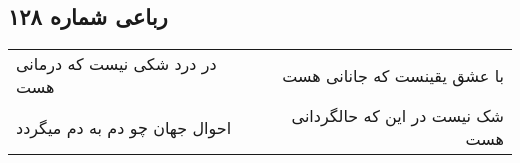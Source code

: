 \begin{center}
\section*{رباعی شماره ۱۲۸}
\label{sec:sh128}
\begin{longtable}{l p{0.5cm} r}
در درد شکی نیست که درمانی هست
&&
با عشق یقینست که جانانی هست
\\
احوال جهان چو دم به دم میگردد
&&
شک نیست در این که حالگردانی هست
\\
\end{longtable}
\end{center}
